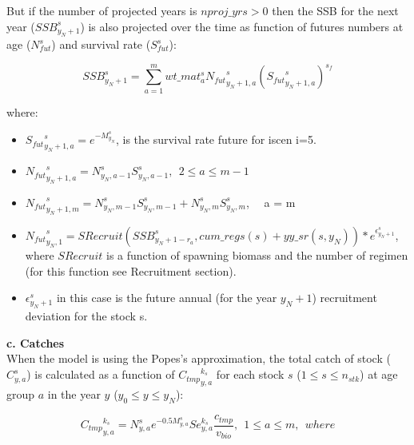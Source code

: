 \documentclass{article}
\begin{document}
But if the number of projected years is $nproj\_yrs>0$ then the SSB for the next year ($SSB^s_{y_N+1}$) is also projected over the time as function of futures numbers at age ($N^s_{fut}$) and survival rate ($S^s_{fut}$): 

\begin{equation}
    SSB^s_{y_N+1}= \sum_{a=1}^m wt\_{mat}^s_a{N_{fut}}^s_{y_N+1,a}({{S_{fut}}^s_{y_N+1,a}})^{s_f}
\end{equation}

where: 

\begin{itemize}

    \item ${S_{fut}}^s_{y_N+1,a} = e^{-M^s_{y_N}}$, is the survival rate future for iscen i=5.

    \item ${N_{fut}}^s_{y_N+1,a} = N^s_{y_N,a-1}S^s_{y_N,a-1}, \ \ 2\leq a \leq m-1$
    
    \item ${N_{fut}}^s_{y_N+1,m} = N^s_{y_N,m-1}S^s_{y_N,m-1}+N^s_{y_N,m}S^s_{y_N,m}$, \ \ a = m 
    
    \item ${N_{fut}}^s_{y_N,1} = SRecruit(SSB^s_{y_N+1-r_a},cum\_regs(s)+yy\_sr(s,y_N))*e^{\epsilon^s_{y_N+1}}$, where $SRecruit$ is a function of  spawning biomass and the number of regimen (for this function see Recruitment section).
    \item $\epsilon^s_{y_N+1}$ in this case is the future annual (for the year $y_N+1$) recruitment deviation for the stock s. 
    
\end{itemize}


\hfill

\textbf{c. Catches}\\

When the model is using the Popes's approximation, the total catch of stock ($C^s_{y,a}$) is calculated as a function of ${C_{tmp}}^{k_s}_{y,a}$ for each stock $s$ ($1\leq s \leq n_{stk}$) at age group $a$ in the year $y$ ($y_0 \leq y \leq y_N$): 

\begin{equation}
{C_{tmp}}^{k_s}_{y,a}=N^s_{y,a}e^{-0.5M^s_{y,a}} Se_{y,a}^{k_s} \dfrac{c_{tmp}}{v_{bio}}, \ \  1\leq a \leq m, \ \ where
\end{equation}
\end{document}
